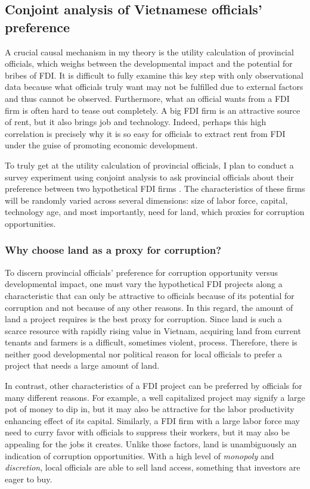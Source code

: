 \subsection{Conjoint analysis of Vietnamese officials' preference}

A crucial causal mechanism in my theory is the utility calculation of provincial officials, which weighs between the developmental impact and the potential for bribes of FDI. It is difficult to fully examine this key step with only observational data because what officials truly want may not be fulfilled due to external factors and thus cannot be observed. Furthermore, what an official wants from a FDI firm is often hard to tease out completely. A big FDI firm is an attractive source of rent, but it also brings job and technology. Indeed, perhaps this high correlation is precisely why it is so easy for officials to extract rent from FDI under the guise of promoting economic development.

To truly get at the utility calculation of provincial officials, I plan to conduct a survey experiment using conjoint analysis to ask provincial officials about their preference between two hypothetical FDI firms \citep{Hainmueller2014}. The characteristics of these firms will be randomly varied across several dimensions: size of labor force, capital, technology age, and most importantly, need for land, which proxies for corruption opportunities.

\subsubsection{Why choose land as a proxy for corruption?}

To discern provincial officials' preference for corruption opportunity versus developmental impact, one must vary the hypothetical FDI projects along a characteristic that can only be attractive to officials because of its potential for corruption and not because of any other reasons. In this regard, the amount of land a project requires is the best proxy for corruption. Since land is such a scarce resource with rapidly rising value in Vietnam, acquiring land from current tenants and farmers is a difficult, sometimes violent, process. Therefore, there is neither good developmental nor political reason for local officials to prefer a project that needs a large amount of land. 

In contrast, other characteristics of a FDI project can be preferred by officials for many different reasons. For example, a well capitalized project may signify a large pot of money to dip in, but it may also be attractive for the labor productivity enhancing effect of its capital. Similarly, a FDI firm with a large labor force may need to curry favor with officials to suppress their workers, but it may also be appealing for the jobs it creates.  Unlike those factors, land is unambiguously an indication of corruption opportunities. With a high level of \textit{monopoly} and \textit{discretion}, local officials are able to sell land access, something that investors are eager to buy.

